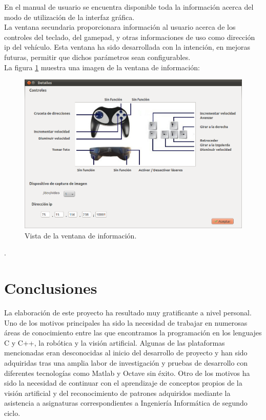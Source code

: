 \documentclass[a4paper,12pt]{article}
\begin{document}
En el manual de usuario se encuentra disponible toda la información acerca del modo de utilización de la interfaz gráfica.\\

La ventana secundaria proporcionara información al usuario acerca de los controles del teclado, del gamepad, y otras informaciones de uso como dirección ip del vehículo. Esta ventana ha sido desarrollada con la intención, en mejoras futuras, permitir que dichos parámetros sean configurables.\\

La figura \ref{fig:ventana-información} muestra una imagen de la ventana de información:

\begin{figure}[H]
  \begin{center}
    \includegraphics[scale=0.5]{imagenes/ventana-controles.png}
  \end{center}
  \caption{Vista de la ventana de información.}
  \label{fig:ventana-información}
\end{figure}.


\section{Conclusiones}

La elaboración de este proyecto ha resultado muy gratificante a nivel personal. Uno de los motivos principales ha sido la necesidad de trabajar en numerosas áreas de conocimiento entre las que encontramos la programación en los lenguajes C y C++, la robótica y la visión artificial. Algunas de las plataformas mencionadas eran desconocidas al inicio del desarrollo de proyecto y han sido adquiridas tras una amplia labor de investigación y pruebas de desarrollo con diferentes tecnologías como Matlab y Octave sin éxito. Otro de los motivos ha sido la necesidad de continuar con el aprendizaje de conceptos propios de la visión artificial y del reconocimiento de patrones adquiridos mediante la asistencia a asignaturas correspondientes a Ingeniería Informática de segundo ciclo.\\
\end{document}
